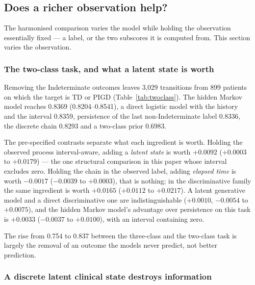 \documentclass[11pt]{article}
\begin{document}
\subsection{Does a richer observation help?}
\label{sec:richer}

The harmonised comparison varies the model while holding the observation
essentially fixed --- a label, or the two subscores it is computed from. This
section varies the observation.

\subsubsection{The two-class task, and what a latent state is worth}

Removing the Indeterminate outcomes leaves 3,029 transitions from 899 patients on
which the target is TD or PIGD (Table~\ref{tab:twoclass}). The hidden Markov
model reaches 0.8369 (0.8204--0.8541), a direct logistic model with the history
and the interval 0.8359, persistence of the last non-Indeterminate label 0.8336,
the discrete chain 0.8293 and a two-class prior 0.6983.

The pre-specified contrasts separate what each ingredient is worth. Holding the
observed process interval-aware, adding a \emph{latent state} is worth $+0.0092$
($+0.0003$ to $+0.0179$) --- the one structural comparison in this paper whose
interval excludes zero. Holding the chain in the observed label, adding
\emph{elapsed time} is worth $-0.0017$ ($-0.0039$ to $+0.0003$), that is nothing;
in the discriminative family the same ingredient is worth $+0.0165$ ($+0.0112$ to
$+0.0217$). A latent generative model and a direct discriminative one are
indistinguishable ($+0.0010$, $-0.0054$ to $+0.0075$), and the hidden Markov
model's advantage over persistence on this task is $+0.0033$ ($-0.0037$ to
$+0.0100$), with an interval containing zero.

The rise from 0.754 to 0.837 between the three-class and the two-class task is
largely the removal of an outcome the models never predict, not better
prediction.

\begin{table}[t]
\centering
\caption{Next-visit TD-against-PIGD prediction on the 3,029 eligible transitions
of 899 patients, leave-one-patient-out. $^{\dagger}$The persistence rule's log
loss is undefined and is reported clipped.}
\label{tab:twoclass}
\small

\end{table}

\subsubsection{A discrete latent clinical state destroys information}
\end{document}
